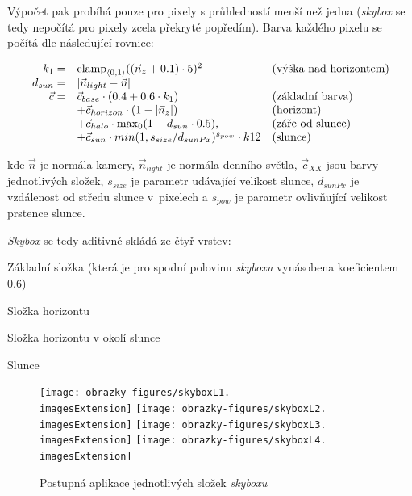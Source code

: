 Výpočet pak probíhá pouze pro pixely s průhledností menší než jedna (\textit{skybox} se tedy nepočítá pro pixely zcela překryté popředím). Barva každého pixelu se počítá dle následující rovnice:

\begin{equation}
\begin{array}{r l l}
	k_1 = & \text{clamp}_{\langle 0,1 \rangle}((\vec{n}_z + 0.1) \cdot 5)^2 & \text{(výška nad horizontem)} \\
	d_{sun} = & |\vec{n}_{light} - \vec{n}| \\
	\vec{c} = & \vec{c}_{base} \cdot (0.4 + 0.6 \cdot k_1) & \text{(základní barva)} \\
	& + \vec{c}_{horizon} \cdot (1 - |\vec{n}_z|) & \text{(horizont)} \\
	& + \vec{c}_{halo} \cdot \max_0(1 - d_{sun} \cdot 0.5) \text{,} & \text{(záře od slunce)} \\
	& + \vec{c}_{sun} \cdot min(1, s_{size} / d_{sunPx}) ^ {s_{pow}} \cdot k12 & \text{(slunce)}
\end{array}
\end{equation}

kde $\vec{n}$ je normála kamery, $\vec{n}_{light}$ je normála denního světla, $\vec{c}_{XX}$ jsou barvy jednotlivých složek, $s_{size}$ je parametr udávající velikost slunce, $d_{sunPx}$ je vzdálenost od středu slunce v~pixelech a $s_{pow}$ je parametr ovlivňující velikost prstence slunce.

\textit{Skybox} se tedy aditivně skládá ze čtyř vrstev:
\begin{compactenum}
	\item Základní složka (která je pro spodní polovinu \textit{skyboxu} vynásobena koeficientem $0.6$)
	\item Složka horizontu
	\item Složka horizontu v okolí slunce
	\item Slunce
\end{compactenum}

\begin{figure}[H]
	\texttt{[image: obrazky-figures/skyboxL1.\\imagesExtension]}
	\hfill
	\texttt{[image: obrazky-figures/skyboxL2.\\imagesExtension]}
	\hfill
	\texttt{[image: obrazky-figures/skyboxL3.\\imagesExtension]}
	\hfill
	\texttt{[image: obrazky-figures/skyboxL4.\\imagesExtension]}
	\caption{Postupná aplikace jednotlivých složek \textit{skyboxu}}
\end{figure}

